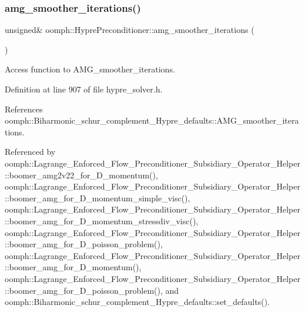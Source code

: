 \mbox{\label{classoomph_1_1HyprePreconditioner_a03bb49bd0f7dabbc8ef39b9743d1dcf1}} 
\subsubsection{\texorpdfstring{amg\+\_\+smoother\+\_\+iterations()}{amg\_smoother\_iterations()}}
{\footnotesize\ttfamily unsigned\& oomph\+::\+Hypre\+Preconditioner\+::amg\+\_\+smoother\+\_\+iterations (\begin{DoxyParamCaption}{ }\end{DoxyParamCaption})\hspace{0.3cm}{\ttfamily [inline]}}



Access function to A\+M\+G\+\_\+smoother\+\_\+iterations. 



Definition at line 907 of file hypre\+\_\+solver.\+h.



References oomph\+::\+Biharmonic\+\_\+schur\+\_\+complement\+\_\+\+Hypre\+\_\+defaults\+::\+A\+M\+G\+\_\+smoother\+\_\+iterations.



Referenced by oomph\+::\+Lagrange\+\_\+\+Enforced\+\_\+\+Flow\+\_\+\+Preconditioner\+\_\+\+Subsidiary\+\_\+\+Operator\+\_\+\+Helper\+::boomer\+\_\+amg2v22\+\_\+for\+\_\+D\+\_\+momentum(), oomph\+::\+Lagrange\+\_\+\+Enforced\+\_\+\+Flow\+\_\+\+Preconditioner\+\_\+\+Subsidiary\+\_\+\+Operator\+\_\+\+Helper\+::boomer\+\_\+amg\+\_\+for\+\_\+D\+\_\+momentum\+\_\+simple\+\_\+visc(), oomph\+::\+Lagrange\+\_\+\+Enforced\+\_\+\+Flow\+\_\+\+Preconditioner\+\_\+\+Subsidiary\+\_\+\+Operator\+\_\+\+Helper\+::boomer\+\_\+amg\+\_\+for\+\_\+D\+\_\+momentum\+\_\+stressdiv\+\_\+visc(), oomph\+::\+Lagrange\+\_\+\+Enforced\+\_\+\+Flow\+\_\+\+Preconditioner\+\_\+\+Subsidiary\+\_\+\+Operator\+\_\+\+Helper\+::boomer\+\_\+amg\+\_\+for\+\_\+D\+\_\+poisson\+\_\+problem(), oomph\+::\+Lagrange\+\_\+\+Enforced\+\_\+\+Flow\+\_\+\+Preconditioner\+\_\+\+Subsidiary\+\_\+\+Operator\+\_\+\+Helper\+::boomer\+\_\+amg\+\_\+for\+\_\+D\+\_\+momentum(), oomph\+::\+Lagrange\+\_\+\+Enforced\+\_\+\+Flow\+\_\+\+Preconditioner\+\_\+\+Subsidiary\+\_\+\+Operator\+\_\+\+Helper\+::boomer\+\_\+amg\+\_\+for\+\_\+D\+\_\+poisson\+\_\+problem(), and oomph\+::\+Biharmonic\+\_\+schur\+\_\+complement\+\_\+\+Hypre\+\_\+defaults\+::set\+\_\+defaults().


